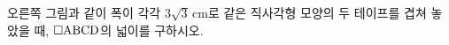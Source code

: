 \noindent\begin{minipage}[t]{0.58\linewidth}\vspace{0pt}\raggedright 오른쪽 그림과 같이 폭이 각각 $3\sqrt{3}\,\mathrm{cm}$로 같은 직사각형 모양의 두 테이프를 겹쳐 놓았을 때, $\square\mathrm{ABCD}$의 넓이를 구하시오.\end{minipage}\hfill\begin{minipage}[t]{0.4\linewidth}\vspace{0pt}\centering \resizebox{\ifdim\width>\linewidth\linewidth\else\width\fi}{!}{}\end{minipage}\par
